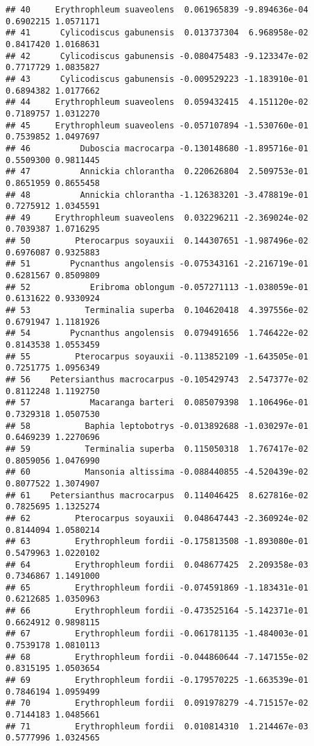 \documentclass[]{article}
\begin{document}
\begin{verbatim}
## 40     Erythrophleum suaveolens  0.061965839 -9.894636e-04 0.6902215 1.0571171
## 41      Cylicodiscus gabunensis  0.013737304  6.968958e-02 0.8417420 1.0168631
## 42      Cylicodiscus gabunensis -0.080475483 -9.123347e-02 0.7717729 1.0835827
## 43      Cylicodiscus gabunensis -0.009529223 -1.183910e-01 0.6894382 1.0177662
## 44     Erythrophleum suaveolens  0.059432415  4.151120e-02 0.7189757 1.0312270
## 45     Erythrophleum suaveolens -0.057107894 -1.530760e-01 0.7539852 1.0497697
## 46          Duboscia macrocarpa -0.130148680 -1.895716e-01 0.5509300 0.9811445
## 47          Annickia chlorantha  0.220626804  2.509753e-01 0.8651959 0.8655458
## 48          Annickia chlorantha -1.126383201 -3.478819e-01 0.7275912 1.0345591
## 49     Erythrophleum suaveolens  0.032296211 -2.369024e-02 0.7039387 1.0716295
## 50         Pterocarpus soyauxii  0.144307651 -1.987496e-02 0.6976087 0.9325883
## 51        Pycnanthus angolensis -0.075343161 -2.216719e-01 0.6281567 0.8509809
## 52            Eribroma oblongum -0.057271113 -1.038059e-01 0.6131622 0.9330924
## 53           Terminalia superba  0.104620418  4.397556e-02 0.6791947 1.1181926
## 54        Pycnanthus angolensis  0.079491656  1.746422e-02 0.8143538 1.0553459
## 55         Pterocarpus soyauxii -0.113852109 -1.643505e-01 0.7251775 1.0956349
## 56    Petersianthus macrocarpus -0.105429743  2.547377e-02 0.8112248 1.1192750
## 57            Macaranga barteri  0.085079398  1.106496e-01 0.7329318 1.0507530
## 58           Baphia leptobotrys -0.013892688 -1.030297e-01 0.6469239 1.2270696
## 59           Terminalia superba  0.115050318  1.767417e-02 0.8059056 1.0476990
## 60           Mansonia altissima -0.088440855 -4.520439e-02 0.8077522 1.3074907
## 61    Petersianthus macrocarpus  0.114046425  8.627816e-02 0.7825695 1.1325274
## 62         Pterocarpus soyauxii  0.048647443 -2.360924e-02 0.8144094 1.0580214
## 63         Erythrophleum fordii -0.175813508 -1.893080e-01 0.5479963 1.0220102
## 64         Erythrophleum fordii  0.048677425  2.209358e-03 0.7346867 1.1491000
## 65         Erythrophleum fordii -0.074591869 -1.183431e-01 0.6212685 1.0350963
## 66         Erythrophleum fordii -0.473525164 -5.142371e-01 0.6624912 0.9898115
## 67         Erythrophleum fordii -0.061781135 -1.484003e-01 0.7539178 1.0810113
## 68         Erythrophleum fordii -0.044860644 -7.147155e-02 0.8315195 1.0503654
## 69         Erythrophleum fordii -0.179570225 -1.663539e-01 0.7846194 1.0959499
## 70         Erythrophleum fordii  0.091978279 -4.715157e-02 0.7144183 1.0485661
## 71         Erythrophleum fordii  0.010814310  1.214467e-03 0.5777996 1.0324565

\end{verbatim}
\end{document}
